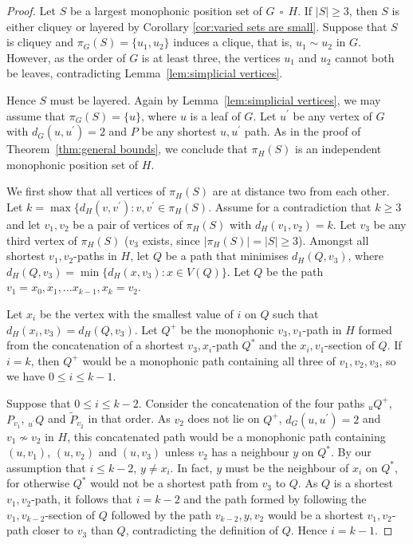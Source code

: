 \documentclass[12pt]{article}
\DeclareMathOperator{\cp}{\,\square\,}
\begin{document}
\begin{proof} 
Let $S$ be a largest monophonic position set of $G\cp H$. If $|S|\geq 3$, then $S$ is either cliquey or layered by Corollary \ref{cor:varied sets are small}. Suppose that $S$ is cliquey and $\pi_G(S)=\{u_1, u_2\}$ induces a clique, that is, $u_1\sim u_2$ in $G$. However, as the order of $G$ is at least three, the vertices $u_1$ and $u_2$ cannot both be leaves, contradicting Lemma~\ref{lem:simplicial vertices}. 

Hence $S$ must be layered. Again by Lemma~\ref{lem:simplicial vertices}, we may assume that $\pi_G(S)=\{u\}$, where $u$ is a leaf of $G$. Let $u^{\prime }$ be any vertex of $G$ with $d_G(u,u^{\prime }) = 2$ and $P$ be any shortest $u,u^{\prime }$ path. As in the proof of Theorem~\ref{thm:general bounds}, we conclude that $\pi_H(S)$ is an independent monophonic position set of $H$. 

We first show that all vertices of $\pi _H(S)$ are at distance two from each other. Let $k = \max \{ d_H(v,v^{\prime }):v,v^{\prime } \in \pi _H(S)$. Assume for a contradiction that $k \geq 3$ and let $v_1,v_2$ be a pair of vertices of $\pi _H(S)$ with $d_H(v_1,v_2) = k$. Let $v_3$ be any third vertex of $\pi _H(S)$ ($v_3$ exists, since $|\pi _H(S)| = |S| \geq 3$). Amongst all shortest $v_1,v_2$-paths in $H$, let $Q$ be a path that minimises $d_H(Q,v_3)$, where $d_H(Q,v_3) = \min \{ d_H(x,v_3):x \in V(Q)\} $. Let $Q$ be the path $v_1 = x_0,x_1,\dots x_{k-1},x_k = v_2$. 

Let $x_i$ be the vertex with the smallest value of $i$ on $Q$ such that $d_H(x_i,v_3) = d_H(Q,v_3)$. Let $Q^+$ be the monophonic $v_3,v_1$-path in $H$ formed from the concatenation of a shortest $v_3,x_i$-path $Q^*$ and the $x_i,v_1$-section of $Q$. If $i = k$, then $Q^+$ would be a monophonic path containing all three of $v_1,v_2,v_3$, so we have $0 \leq i \leq k-1$.   

Suppose that $0 \leq i \leq k-2$. Consider the concatenation of the four paths $_uQ^+$, $P_{v_1}$, $_{u^{\prime }}Q$ and $\widetilde{P}_{v_2}$ in that order. As $v_2$ does not lie on $Q^+$, $d_G(u,u^{\prime }) = 2$ and $v_1 \not \sim v_2$ in $H$, this concatenated path would be a monophonic path containing $(u,v_1)$, $(u,v_2)$ and $(u,v_3)$ unless $v_2$ has a neighbour $y$ on $Q^*$. By our assumption that $i \leq k-2$, $y \neq x_i$. In fact, $y$ must be the neighbour of $x_i$ on $Q^*$, for otherwise $Q^*$ would not be a shortest path from $v_3$ to $Q$. As $Q$ is a shortest $v_1,v_2$-path, it follows that $i = k-2$ and the path formed by following the $v_1,v_{k-2}$-section of $Q$ followed by the path $v_{k-2},y,v_2$ would be a shortest $v_1,v_2$-path closer to $v_3$ than $Q$, contradicting the definition of $Q$. Hence $i = k-1$.   


\end{proof}
\end{document}
